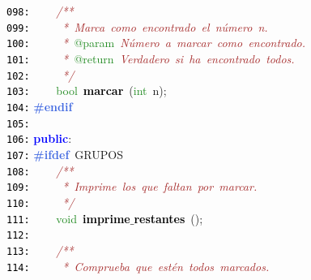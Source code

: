 \documentclass[a4paper,10pt]{scrartcl}
\begin{document}
{   \mbox{}\texttt{\textcolor{Black}{098:}} \ \ \ \ \textit{\textcolor{Brown}{/**}} \\
   \mbox{}\texttt{\textcolor{Black}{099:}} \textit{\textcolor{Brown}{\ \ \ \ \ *\ Marca\ como\ encontrado\ el\ número\ n.}} \\
   \mbox{}\texttt{\textcolor{Black}{100:}} \textit{\textcolor{Brown}{\ \ \ \ \ *\ }}\textcolor{ForestGreen}{@param}\textit{\textcolor{Brown}{\ Número\ a\ marcar\ como\ encontrado.}} \\
   \mbox{}\texttt{\textcolor{Black}{101:}} \textit{\textcolor{Brown}{\ \ \ \ \ *\ }}\textcolor{ForestGreen}{@return}\textit{\textcolor{Brown}{\ Verdadero\ si\ ha\ encontrado\ todos.}} \\
   \mbox{}\texttt{\textcolor{Black}{102:}} \textit{\textcolor{Brown}{\ \ \ \ \ */}} \\
   \mbox{}\texttt{\textcolor{Black}{103:}} \ \ \ \ \textcolor{ForestGreen}{bool}\ \textbf{\textcolor{Black}{marcar}}\ \textcolor{BrickRed}{(}\textcolor{ForestGreen}{int}\ n\textcolor{BrickRed}{);} \\
   \mbox{}\texttt{\textcolor{Black}{104:}} \textbf{\textcolor{RoyalBlue}{\#endif}} \\
   \mbox{}\texttt{\textcolor{Black}{105:}} \ \  \\
   \mbox{}\texttt{\textcolor{Black}{106:}} \textbf{\textcolor{Blue}{public}}\textcolor{BrickRed}{:} \\
   \mbox{}\texttt{\textcolor{Black}{107:}} \textbf{\textcolor{RoyalBlue}{\#ifdef}}\ GRUPOS \\
   \mbox{}\texttt{\textcolor{Black}{108:}} \ \ \ \ \textit{\textcolor{Brown}{/**}} \\
   \mbox{}\texttt{\textcolor{Black}{109:}} \textit{\textcolor{Brown}{\ \ \ \ \ *\ Imprime\ los\ que\ faltan\ por\ marcar.}} \\
   \mbox{}\texttt{\textcolor{Black}{110:}} \textit{\textcolor{Brown}{\ \ \ \ \ */}} \\
   \mbox{}\texttt{\textcolor{Black}{111:}} \ \ \ \ \textcolor{ForestGreen}{void}\ \textbf{\textcolor{Black}{imprime$\_$restantes}}\ \textcolor{BrickRed}{();} \\
   \mbox{}\texttt{\textcolor{Black}{112:}} \ \  \\
   \mbox{}\texttt{\textcolor{Black}{113:}} \ \ \ \ \textit{\textcolor{Brown}{/**}} \\
   \mbox{}\texttt{\textcolor{Black}{114:}} \textit{\textcolor{Brown}{\ \ \ \ \ *\ Comprueba\ que\ estén\ todos\ marcados.}} \\
}
\end{document}
